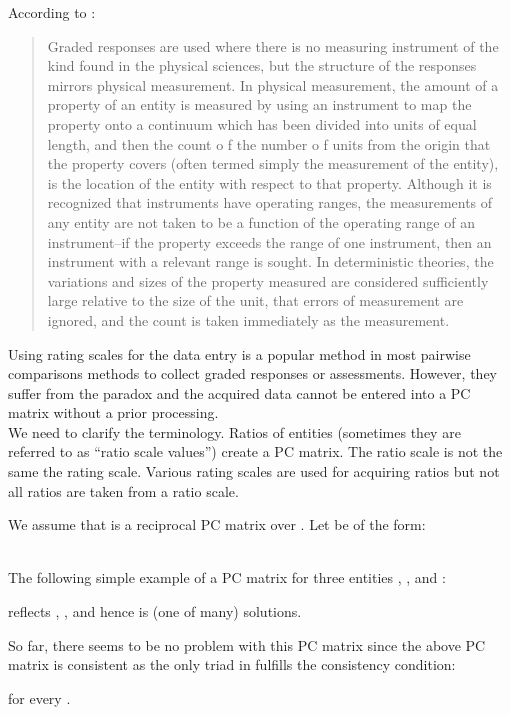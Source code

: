 \documentclass [12pt]{article}
\begin{document}
\noindent According to \cite{DA1995}:
\begin{quote}
Graded responses are used where there is no measuring instrument
of the kind found in the physical sciences, but the structure of the responses mirrors physical measurement. In physical measurement, the amount of a property of an entity
is measured by using an instrument to map the property onto a continuum which has been divided into units of equal length, and then the count o f the number o f units from the origin that the property covers (often termed simply the measurement of the entity), is the location of the entity with respect to that property. Although it is recognized that instruments have operating ranges, the measurements of any entity are not taken to be a function of the operating range of an instrument--if the property exceeds the range of one instrument, then an instrument with a relevant range is sought. In deterministic theories, the variations and sizes of the property measured are considered sufficiently large relative to the size of the unit, that errors of measurement are ignored, and the count is taken immediately as the measurement.
\end{quote}

Using rating scales for the data entry is a popular method in most pairwise comparisons methods to collect graded responses or assessments. However, they suffer from the paradox and the acquired data cannot be entered into a PC matrix without a prior processing. \\

We need to clarify the terminology. Ratios of entities (sometimes they are referred to as ``ratio scale values'') create a PC matrix. The ratio scale is not the same the rating scale. Various rating scales are used for acquiring ratios but not all ratios are taken from a ratio scale.  

We assume that  is a reciprocal PC matrix over . Let  be of the form:

 \\

\noindent The following simple example of a PC matrix for three entities , , and :



\noindent reflects , , and  hence  is (one of many) solutions.

So far, there seems to be no problem with this PC matrix since the above PC matrix  is consistent as the only triad in  fulfills the consistency condition: 


for every . \\
 
\end{document}
